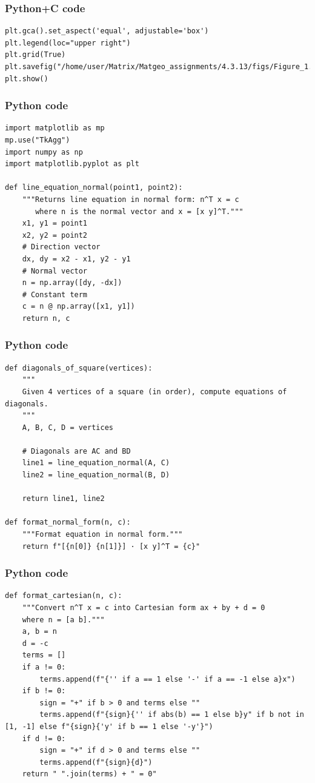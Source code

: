 \documentclass{beamer}
\begin{document}
\begin{frame}[fragile]
    \frametitle{Python+C code}

    \begin{lstlisting}
plt.gca().set_aspect('equal', adjustable='box')
plt.legend(loc="upper right")
plt.grid(True)
plt.savefig("/home/user/Matrix/Matgeo_assignments/4.3.13/figs/Figure_1.png")
plt.show()
    \end{lstlisting}
\end{frame}


\begin{frame}[fragile]
    \frametitle{Python code}

    \begin{lstlisting}
import matplotlib as mp
mp.use("TkAgg")
import numpy as np
import matplotlib.pyplot as plt

def line_equation_normal(point1, point2):
    """Returns line equation in normal form: n^T x = c
       where n is the normal vector and x = [x y]^T."""
    x1, y1 = point1
    x2, y2 = point2
    # Direction vector
    dx, dy = x2 - x1, y2 - y1
    # Normal vector
    n = np.array([dy, -dx])
    # Constant term
    c = n @ np.array([x1, y1])
    return n, c
    \end{lstlisting}
\end{frame}

\begin{frame}[fragile]
    \frametitle{Python code}

    \begin{lstlisting}
def diagonals_of_square(vertices):
    """
    Given 4 vertices of a square (in order), compute equations of diagonals.
    """
    A, B, C, D = vertices
    
    # Diagonals are AC and BD
    line1 = line_equation_normal(A, C)
    line2 = line_equation_normal(B, D)
    
    return line1, line2

def format_normal_form(n, c):
    """Format equation in normal form."""
    return f"[{n[0]} {n[1]}] · [x y]^T = {c}"

    \end{lstlisting}
\end{frame}


\begin{frame}[fragile]
    \frametitle{Python code}

    \begin{lstlisting}
def format_cartesian(n, c):
    """Convert n^T x = c into Cartesian form ax + by + d = 0
    where n = [a b]."""
    a, b = n
    d = -c
    terms = []
    if a != 0:
        terms.append(f"{'' if a == 1 else '-' if a == -1 else a}x")
    if b != 0:
        sign = "+" if b > 0 and terms else ""
        terms.append(f"{sign}{'' if abs(b) == 1 else b}y" if b not in [1, -1] else f"{sign}{'y' if b == 1 else '-y'}")
    if d != 0:
        sign = "+" if d > 0 and terms else ""
        terms.append(f"{sign}{d}")
    return " ".join(terms) + " = 0"

    \end{lstlisting}
\end{frame}
\end{document}
